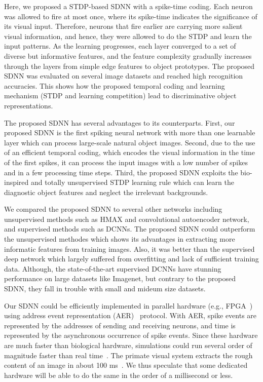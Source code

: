 \documentclass[preprint,5p,12pt,twocolumn]{article}
\begin{document}
Here, we proposed a STDP-based SDNN with a spike-time coding. Each neuron was allowed to fire at most once, where its spike-time indicates the significance of its visual input. Therefore, neurons that fire earlier are carrying more salient visual information, and hence, they were allowed to do the STDP and learn the input patterns. As the learning progresses, each layer converged to a set of diverse but informative features, and the feature complexity gradually increases through the layers from simple edge features to object prototypes. The proposed SDNN was evaluated on several image datasets and reached high recognition accuracies. This shows how the proposed temporal coding and learning mechanism (STDP and learning competition) lead to  discriminative object representations.

The proposed SDNN has several advantages to its counterparts. First, our proposed SDNN is the first spiking neural network with more than one learnable layer which can process large-scale natural object images. Second, due to the use of an efficient temporal coding, which encodes the visual information in the time of the first spikes, it can process the input images with a low number of spikes and in a few processing time steps. Third, the proposed SDNN exploits the bio-inspired and totally unsupervised STDP learning rule which can learn the diagnostic object features and neglect the irrelevant backgrounds.

We compared the proposed SDNN to several other networks including unsupervised methods such as HMAX and convolutional autoencoder network, and supervised methods such as DCNNs. The proposed SDNN could outperform the unsupervised methodes which shows its advantages in extracting more informatic features from training images. Also, it was better than the supervised deep network which largely suffered from overfitting and lack of sufficient training data. Although, the state-of-the-art supervised DCNNs have stunning performance on large datasets like Imagenet, but contrary to the proposed SDNN, they fall in trouble with small and mideum size datasets.

Our SDNN could be efficiently implemented in parallel hardware (e.g., FPGA~\cite{Yousefzadeh2015}) using address event representation (AER)~\cite{Sivilotti1991} protocol. With AER, spike events are represented by the addresses of sending and receiving neurons, and time is represented by the asynchronous occurrence of spike events. Since these hardware are much faster than biological hardware, simulations could run several order of magnitude faster than real time~\cite{Serrano-Gotarredona2013}. The primate visual system extracts the rough content of an image in about 100 ms~\cite{thorpe1996speed,hung2005fast,Kirchner2006,liu2009timing}. We thus speculate that some dedicated hardware will be able to do the same in the order of a millisecond or less.
\end{document}
